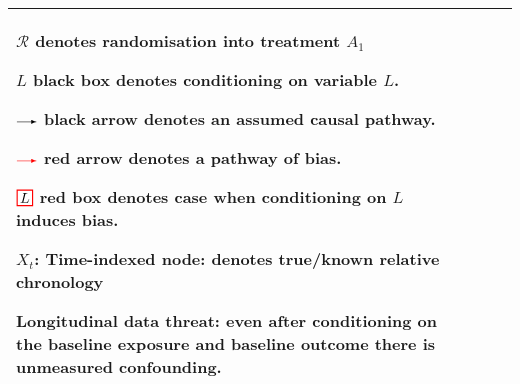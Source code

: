 {\begin{tabular}{>{\raggedright\arraybackslash\small}m{0.5cm} >{\raggedright\arraybackslash\small}m{4.65cm} >{\raggedright\arraybackslash\small}m{6.35cm} >{\raggedright\arraybackslash\small}m{2.5cm}}
{%

$\mathcal{R}$ denotes randomisation into treatment $A_1$

$\boxed{L}$ \textbf{black box} denotes conditioning on variable $L$.

$\rightarrowNEW$ \textbf{black arrow} denotes an assumed causal pathway.

$\rightarrowred$ \textbf{red arrow} denotes a pathway of bias. %

$\boxedred{L}$ \textbf{red box} denotes case when conditioning on $L$ induces bias.

$X_t$: \textbf{Time-indexed node}: denotes true/known relative chronology


\textbf{Longitudinal data threat}: even after conditioning on the baseline exposure and baseline outcome there is unmeasured confounding.}\\
\bottomrule
\end{tabular}
}
